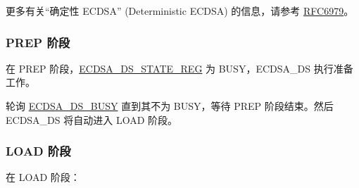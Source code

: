 \documentclass[main\_\_CN.tex]{subfiles}
\begin{document}
\begin{tiplisting}
更多有关“确定性 ECDSA” (Deterministic ECDSA) 的信息，请参考 \href{https://www.rfc-editor.org/rfc/rfc6979}{RFC6979}。
\end{tiplisting}

\subsubsection{PREP 阶段}

在 PREP 阶段，\hyperref[regdesc:ECDSADSSTATEREG]{ECDSA\_DS\_STATE\_REG} 为 BUSY，ECDSA\_DS 执行准备工作。

轮询 \hyperref[fielddesc:ECDSADSBUSY]{ECDSA\_DS\_BUSY} 直到其不为 BUSY，等待 PREP 阶段结束。然后 ECDSA\_DS 将自动进入 LOAD 阶段。

\subsubsection{LOAD 阶段}
在 LOAD 阶段：
\end{document}
